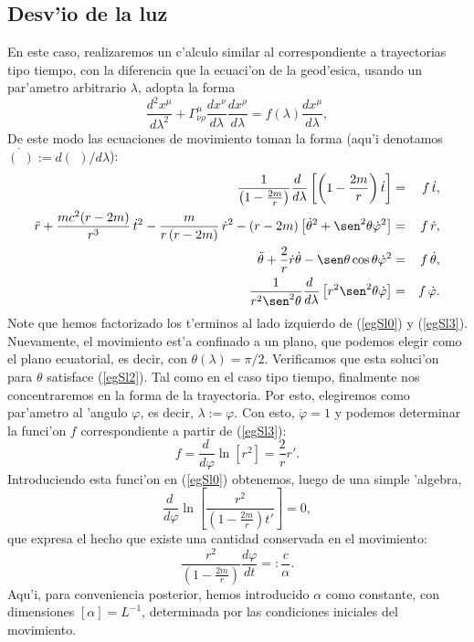 \subsection{Desv'io de la luz}

En este caso, realizaremos un c'alculo similar al correspondiente a trayectorias tipo tiempo, con la diferencia que la ecuaci'on de la geod'esica, usando un par'ametro arbitrario $\lambda$, adopta la forma
\begin{equation}
\frac{d^2x^\mu}{d\lambda^2}+\Gamma^\mu_{\nu\rho}\frac{dx^\nu}{d\lambda}\frac{dx^\rho}{d\lambda}=f(\lambda)\frac{dx^\mu}{d\lambda},
\end{equation}
De este modo las ecuaciones de movimiento toman la forma (aqu'i denotamos $\dot{(\ \,)}:={d(\ \,)}/{d\lambda}$):
\begin{eqnarray}
\frac{1}{\left(1-\frac{2m}{r}\right)}\frac{d\ }{d\lambda}\left[\left(1-\frac{2m}{r}\right)\dot{t}\right]&=&f\,\dot{t}, \label{egSl0}\\
\ddot{r}+\frac{mc^2(r-2m)}{r^3}\,\dot{t}^2-\frac{m}{r\left(
r-2m\right) }\,\dot{r}^2-(r-2m) \left[ \dot{\theta}^2+\sen
^2\theta \dot{\varphi}^2\right] &=&f\,\dot{r}, \label{egSl1}\\
\ddot{\theta}+\frac{2}{r}\dot{r}\dot{\theta}-\sen \theta \cos \theta
\dot{\varphi}^2 &=&f\,\dot{\theta}, \label{egSl2}\\
\frac{1}{r^2\sen^2\theta}\frac{d\ }{d\lambda}\left[r^2\sen^2\theta\dot{\varphi}\right] &=&f\,\dot{\varphi}.\label{egSl3}
\end{eqnarray}%
Note que hemos factorizado los t'erminos al lado izquierdo de (\ref{egSl0}) y (\ref{egSl3}). Nuevamente, el movimiento est'a confinado a un plano, que podemos elegir como el plano ecuatorial, es decir, con $\theta(\lambda)=\pi/2$. Verificamos que esta soluci'on para $\theta$ satisface (\ref{egSl2}). Tal como en el caso tipo tiempo, finalmente nos concentraremos en la forma de la trayectoria. Por esto, elegiremos como par'ametro al 'angulo $\varphi$, es decir, $\lambda:=\varphi$. Con esto, $\dot{\varphi}=1$ y podemos determinar la funci'on $f$ correspondiente a partir de (\ref{egSl3}):
\begin{equation}
f=\frac{d\ }{d\varphi}\ln\left[r^2\right]=\frac{2}{r}r'.
\end{equation}
Introduciendo esta funci'on en (\ref{egSl0}) obtenemos, luego de una simple 'algebra,
\begin{equation}
\frac{d\ }{d\varphi}\ln\left[\frac{r^2}{\left(1-\frac{2m}{r}\right)t'}\right]=0,
\end{equation}
que expresa el hecho que existe una cantidad conservada en el movimiento:
\begin{equation}\label{ccl}
 \frac{r^2}{\left(1-\frac{2m}{r}\right)}\frac{d\varphi}{dt}=:\frac{c}{\alpha}.
\end{equation}
Aqu'i, para conveniencia posterior, hemos introducido $\alpha$ como constante, con dimensiones $[\alpha]=L^{-1}$, determinada por las condiciones iniciales del movimiento.


